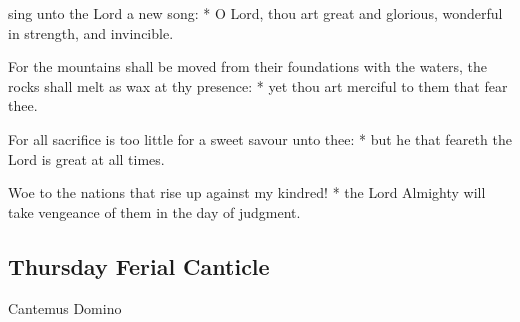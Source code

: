 \begin{multicols}{2}
 sing unto the Lord a new song: * O Lord, thou art great and glorious, wonderful in strength, and invincible.\par
{}
For the mountains shall be moved from their foundations with the waters, {\dag} the rocks shall melt as wax at thy presence: * yet thou art merciful to them that fear thee.\par
For all sacrifice is too little for a sweet savour unto thee: * but he that feareth the Lord is great at all times.\par
Woe to the nations that rise up against my kindred! * the Lord Almighty will take vengeance of them in the day of judgment.

\subsection{Thursday Ferial Canticle}

\begin{inhead}
Cantemus Domino
\end{inhead}


\end{multicols}
